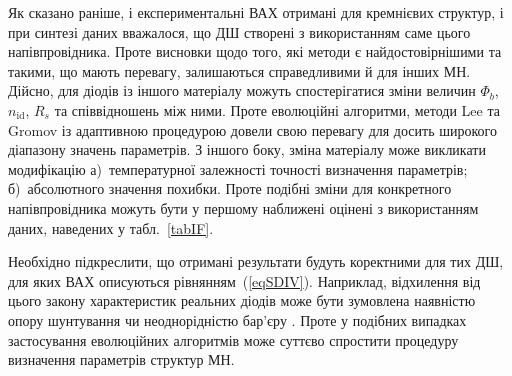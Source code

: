 Як сказано раніше, і експериментальні ВАХ отримані для кремнієвих структур, і при синтезі даних вважалося, що ДШ створені з використанням саме цього напівпровідника.
Проте висновки щодо того, які методи є найдостовірнішими та такими, що мають перевагу, залишаються справедливими й для інших МН.
Дійсно, для діодів із іншого матеріалу можуть спостерігатися зміни  величин $\Phi_b$, $n_\mathrm{id}$, $R_s$ та співвідношень між ними.
Проте еволюційні алгоритми, методи Lee та Gromov із адаптивною процедурою довели свою перевагу для досить широкого діапазону значень параметрів.
З іншого боку, зміна матеріалу може викликати модифікацію
а)~температурної залежності точності визначення параметрів;
б)~абсолютного значення похибки.
Проте подібні зміни для конкретного напівпровідника можуть бути у першому наближені оцінені з використанням даних, наведених у табл.~\ref{tabIF}.

Необхідно підкреслити, що отримані результати будуть коректними для тих ДШ, для яких ВАХ описуються рівнянням~(\ref{eqSDIV}).
Наприклад, відхилення від цього закону характеристик реальних діодів може бути зумовлена наявністю  опору шунтування чи неоднорідністю бар'єру \cite{Tung:MSE,OlikhJAP}.
Проте у подібних випадках застосування еволюційних алгоритмів може суттєво спростити процедуру визначення параметрів структур МН.


